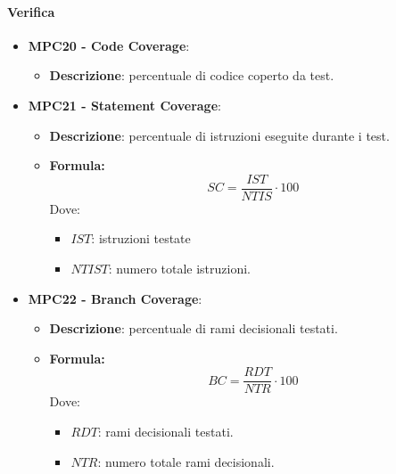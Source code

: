 \documentclass[10pt]{article}
\begin{document}
\begin{justify}
\paragraph{Verifica}
\begin{itemize}
    \item \textbf{MPC20 - Code Coverage}:
    \begin{itemize}
        \item \textbf{Descrizione}: percentuale di codice coperto da test.
    \end{itemize}
    \item \textbf{MPC21 - Statement Coverage}:
    \begin{itemize}
        \item   \textbf{Descrizione}: percentuale di istruzioni eseguite durante i test.
        \item   \textbf{Formula:}
                \[
                SC = \frac{IST}{NTIS} \cdot 100
                \]
                Dove:
                \begin{itemize}
                    \item $IST$: istruzioni testate
                    \item $NTIST$: numero totale istruzioni.
                \end{itemize}
    \end{itemize}
    \item \textbf{MPC22 - Branch Coverage}:
    \begin{itemize}
        \item   \textbf{Descrizione}: percentuale di rami decisionali testati.
        \item   \textbf{Formula:}
            \[
            BC = \frac{RDT}{NTR} \cdot 100
            \]
            Dove:
            \begin{itemize}
                \item $RDT$: rami decisionali testati.
                \item $NTR$: numero totale rami decisionali.
            \end{itemize}
    \end{itemize}


\end{itemize}
\end{justify}
\end{document}
